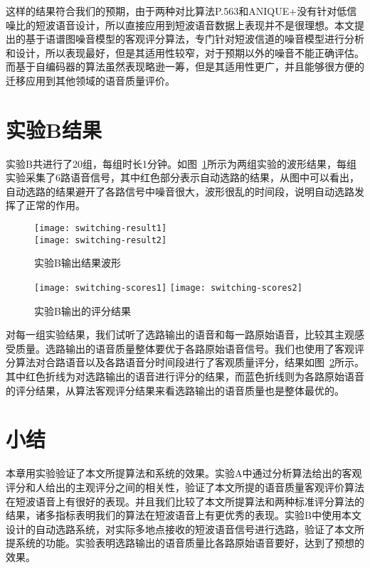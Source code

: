这样的结果符合我们的预期，由于两种对比算法P.563和ANIQUE+没有针对低信噪比的短波语音设计，所以直接应用到短波语音数据上表现并不是很理想。本文提出的基于语谱图噪音模型的客观评分算法，专门针对短波信道的噪音模型进行分析和设计，所以表现最好，但是其适用性较窄，对于预期以外的噪音不能正确评估。而基于自编码器的算法虽然表现略逊一筹，但是其适用性更广，并且能够很方便的迁移应用到其他领域的语音质量评价。

\section{实验B结果}

实验B共进行了20组，每组时长1分钟。如图~\ref{fig:switching-result}所示为两组实验的波形结果，每组实验采集了6路语音信号，其中红色部分表示自动选路的结果，从图中可以看出，自动选路的结果避开了各路信号中噪音很大，波形很乱的时间段，说明自动选路发挥了正常的作用。

\begin{figure}
\centering
{} {
    \texttt{[image: switching-result1]}
}
\vspace{1.2ex}
\\
 {
    \texttt{[image: switching-result2]}
}
\vspace{0.8ex}
\\
\caption{实验B输出结果波形\label{fig:switching-result}}
\end{figure}

\begin{figure}
\centering
\texttt{[image: switching-scores1]}
\texttt{[image: switching-scores2]}
\caption{实验B输出的评分结果\label{fig:switching-scores}}
\end{figure}

对每一组实验结果，我们试听了选路输出的语音和每一路原始语音，比较其主观感受质量。选路输出的语音质量整体要优于各路原始语音信号。我们也使用了客观评分算法对合路语音以及各路语音分时间段进行了客观质量评分，结果如图~\ref{fig:switching-scores}所示。其中红色折线为对选路输出的语音进行评分的结果，而蓝色折线则为各路原始语音的评分结果，从算法客观评分结果来看选路输出的语音质量也是整体最优的。

\section{小结}

本章用实验验证了本文所提算法和系统的效果。实验A中通过分析算法给出的客观评分和人给出的主观评分之间的相关性，验证了本文所提的语音质量客观评价算法在短波语音上有很好的表现。并且我们比较了本文所提算法和两种标准评分算法的结果，诸多指标表明我们的算法在短波语音上有更优秀的表现。实验B中使用本文设计的自动选路系统，对实际多地点接收的短波语音信号进行选路，验证了本文所提系统的功能。实验表明选路输出的语音质量比各路原始语音要好，达到了预想的效果。